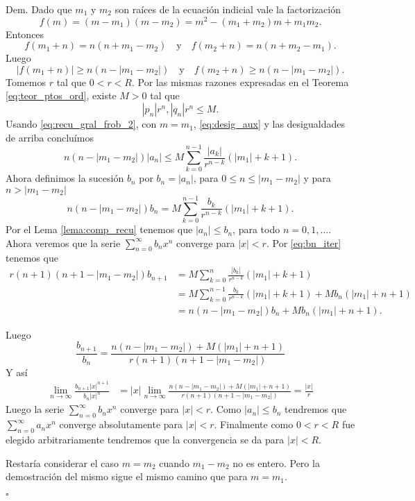 \documentclass{article}
\newenvironment{demo}{\noindent\emph{Dem.}}{{\hspace*{\fill}$\square$} \newline\vspace{5pt}}
\newcounter{defi_cont}
\newcounter{teor_cont}
\newcounter{lem_cont}
\renewcommand{\emph}[1]{\textcolor[rgb]{0,0,1}{#1}}
\begin{document}
\begin{demo} Dado que $m_1$ y $m_2$ son raíces de la ecuación indicial vale la factorización
\[f(m)=(m-m_1)(m-m_2)=m^2-(m_1+m_2)m+m_1m_2.\]
Entonces
\[f(m_1+n)=n(n+m_1-m_2)\quad\text{y}\quad f(m_2+n)=n(n+m_2-m_1).\]
Luego
\begin{equation}\label{eq:desig_aux}|f(m_1+n)|\geq n(n-|m_1-m_2|)\quad\text{y}\quad f(m_2+n)\geq n(n-|m_1-m_2|).
\end{equation}
Tomemos $r$ tal que $0<r<R$. Por las mismas razones expresadas  en el Teorema \eqref{eq:teor_ptos_ord},  existe $M>0$ tal que
\[ |p_n|r^n,|q_n|r^n\leq M.\]
Usando \eqref{eq:recu_gral_frob_2}, con $m=m_1$, \eqref{eq:desig_aux} y las desigualdades de arriba concluímos
\[n(n-|m_1-m_2|)|a_n|\leq M\sum_{k=0}^{n-1}\frac{|a_k|}{r^{n-k}}(|m_1|+k+1).\]
Ahora definimos la sucesión $b_n$ por $b_n=|a_n|$, para $0\leq n\leq|m_1-m_2|$ y para $ n>|m_1-m_2|$
\begin{equation}\label{eq:bn_iter}n(n-|m_1-m_2|)b_n= M\sum_{k=0}^{n-1}\frac{b_k}{r^{n-k}}(|m_1|+k+1).\end{equation}
Por el Lema \ref{lema:comp_recu} tenemos que $|a_n|\leq b_n$, para todo $n=0,1,\ldots$. Ahora veremos que la serie $\sum_{n=0}^{\infty}b_nx^n$ converge para  $|x|<r$. Por \eqref{eq:bn_iter} tenemos que
\[ 
   \begin{split}
     r(n+1)(n+1-|m_1-m_2|)b_{n+1}&=M\sum_{k=0}^{n}\frac{|b_k|}{r^{n-k}}(|m_1|+k+1)\\
&=M\sum_{k=0}^{n-1}\frac{b_k}{r^{n-k}}(|m_1|+k+1)+Mb_n(|m_1|+n+1)\\
&=n(n-|m_1-m_2|)b_n+Mb_n(|m_1|+n+1).
  \end{split}
\]

Luego
\[\frac{b_{n+1}}{b_n}=\frac{ n(n-|m_1-m_2|)+M(|m_1|+n+1) }{ r(n+1)(n+1-|m_1-m_2|)  }\]
Y así
\[ \begin{split}
\lim_{n\to\infty}\frac{b_{n+1}|x|^{n+1}}{b_n|x|^n}&=|x|\lim_{n\to\infty}\frac{ n(n-|m_1-m_2|)+M(|m_1|+n+1) }{ r(n+1)(n+1-|m_1-m_2|)  }=\frac{|x|}{r}
\end{split}
\]
Luego la serie  $\sum_{n=0}^{\infty}b_nx^n$   converge para $|x|<r$. Como $|a_n|\leq b_n$ tendremos que  $\sum_{n=0}^{\infty}a_nx^n$ converge absolutamente para $|x|<r$. Finalmente como $0<r<R$ fue elegido arbitrariamente tendremos que la convergencia se da para $|x|<R$. 

Restaría considerar el caso $m=m_2$ cuando $m_1-m_2$ no es entero. Pero la demostración del mismo sigue el mismo camino que para $m=m_1$.

\end{demo}
\end{document}
